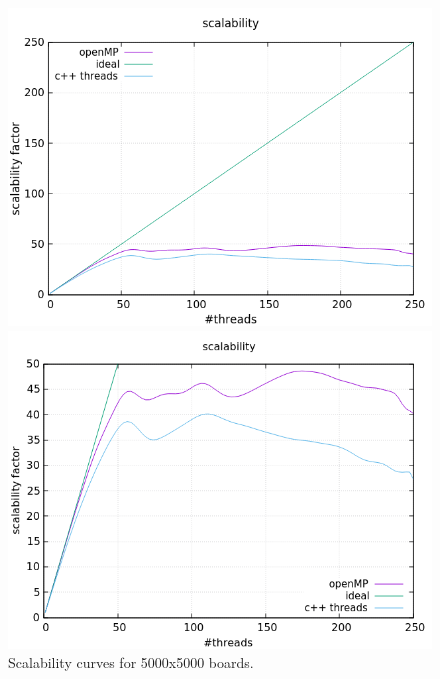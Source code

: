 \documentclass[a4paper,10pt]{article}
\begin{document}
	\begin{figure}[H]
		\centering
		\begin{minipage}[t]{0.55\linewidth}
			\includegraphics[width=\linewidth]{BenchMarkGOL/scalability/5000/graph5000_scal.png}
		\end{minipage}%
		\begin{minipage}[t]{0.55\linewidth}
			\includegraphics[width=\linewidth]{BenchMarkGOL/scalability/5000/graph5000_scal_zoom.png}
		\end{minipage}
		\caption{Scalability curves for 5000x5000 boards.}
		\label{5000s}
	\end{figure}
\end{document}
